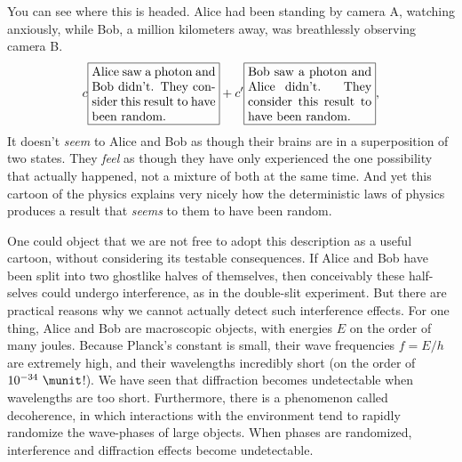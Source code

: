 You can see where this is headed.  Alice had been standing by camera A,
watching anxiously, while Bob, a million kilometers away, was
breathlessly observing camera B. 
\begin{equation*}
 c\fbox{\parbox{35mm}{Alice saw a photon and Bob didn't. They consider this result to have been random.}}
+c'\fbox{\parbox{35mm}{Bob saw a photon and Alice didn't. They consider this result to have been random.}},
\end{equation*}
It doesn't \emph{seem} to Alice and Bob as though their brains are in
a superposition of two states. They \emph{feel} as though they have only
experienced the one possibility that actually happened, not a mixture of
both at the same time. And yet this cartoon of the physics explains very nicely
how the deterministic laws of physics produces a result that \emph{seems}
to them to have been random.

One could object that we are not free to adopt this description as a
useful cartoon, without considering its testable consequences. If
Alice and Bob have been split into two ghostlike halves of themselves,
then conceivably these half-selves could undergo interference, as in
the double-slit experiment. But there are practical reasons why we
cannot actually detect such interference effects. For one thing, Alice
and Bob are macroscopic objects, with energies $E$ on the order of
many joules. Because Planck's constant is small, their wave
frequencies $f=E/h$ are extremely high, and their wavelengths
incredibly short (on the order of $10^{-34}\ \munit$!). We have seen
that diffraction becomes undetectable when wavelengths are too short.
Furthermore, there is a phenomenon called decoherence, in which
interactions with the environment tend to rapidly randomize the
wave-phases of large objects. When phases are randomized, interference and diffraction
effects become undetectable.
